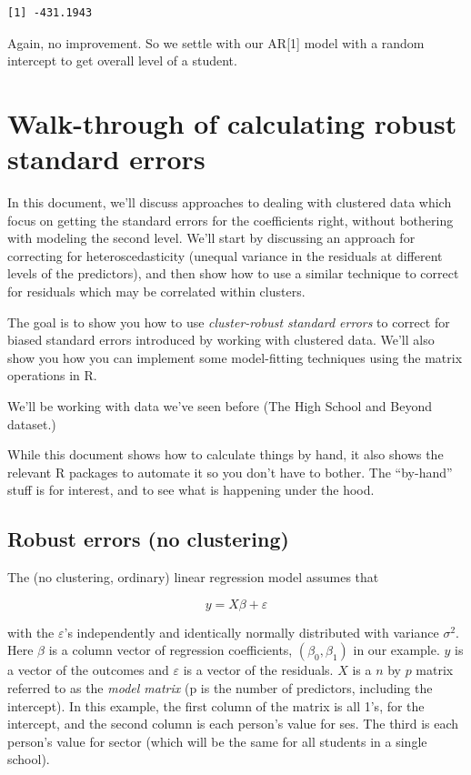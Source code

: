 \documentclass[
  letterpaper,
  DIV=11,
  numbers=noendperiod]{scrreprt}
\begin{document}
\begin{verbatim}
[1] -431.1943
\end{verbatim}

Again, no improvement. So we settle with our AR{[}1{]} model with a
random intercept to get overall level of a student.

\hypertarget{walk-through-of-calculating-robust-standard-errors}{%
\chapter{Walk-through of calculating robust standard
errors}\label{walk-through-of-calculating-robust-standard-errors}}

In this document, we'll discuss approaches to dealing with clustered
data which focus on getting the standard errors for the coefficients
right, without bothering with modeling the second level. We'll start by
discussing an approach for correcting for heteroscedasticity (unequal
variance in the residuals at different levels of the predictors), and
then show how to use a similar technique to correct for residuals which
may be correlated within clusters.

The goal is to show you how to use \emph{cluster-robust standard errors}
to correct for biased standard errors introduced by working with
clustered data. We'll also show you how you can implement some
model-fitting techniques using the matrix operations in R.

We'll be working with data we've seen before (The High School and Beyond
dataset.)

While this document shows how to calculate things by hand, it also shows
the relevant R packages to automate it so you don't have to bother. The
``by-hand'' stuff is for interest, and to see what is happening under
the hood.

\hypertarget{robust-errors-no-clustering}{%
\section{Robust errors (no
clustering)}\label{robust-errors-no-clustering}}

The (no clustering, ordinary) linear regression model assumes that

\[y = X\beta + \varepsilon\]

with the \(\varepsilon\)'s independently and identically normally
distributed with variance \(\sigma^2\). Here \(\beta\) is a column
vector of regression coefficients, \((\beta_0, \beta_1)\) in our
example. \(y\) is a vector of the outcomes and \(\varepsilon\) is a
vector of the residuals. \(X\) is a \(n\) by \(p\) matrix referred to as
the \emph{model matrix} (p is the number of predictors, including the
intercept). In this example, the first column of the matrix is all 1's,
for the intercept, and the second column is each person's value for ses.
The third is each person's value for sector (which will be the same for
all students in a single school).
\end{document}
